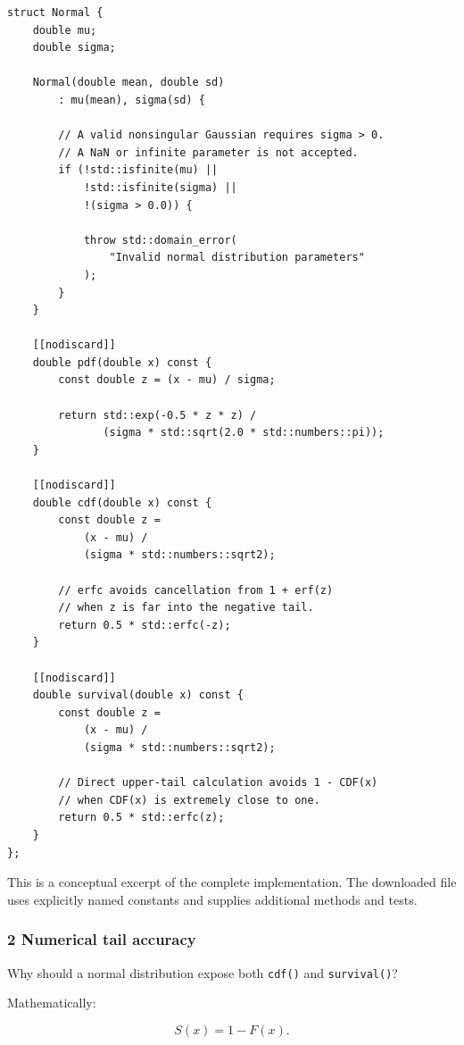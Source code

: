 \begin{verbatim}
struct Normal {
    double mu;
    double sigma;

    Normal(double mean, double sd)
        : mu(mean), sigma(sd) {

        // A valid nonsingular Gaussian requires sigma > 0.
        // A NaN or infinite parameter is not accepted.
        if (!std::isfinite(mu) ||
            !std::isfinite(sigma) ||
            !(sigma > 0.0)) {

            throw std::domain_error(
                "Invalid normal distribution parameters"
            );
        }
    }

    [[nodiscard]]
    double pdf(double x) const {
        const double z = (x - mu) / sigma;

        return std::exp(-0.5 * z * z) /
               (sigma * std::sqrt(2.0 * std::numbers::pi));
    }

    [[nodiscard]]
    double cdf(double x) const {
        const double z =
            (x - mu) /
            (sigma * std::numbers::sqrt2);

        // erfc avoids cancellation from 1 + erf(z)
        // when z is far into the negative tail.
        return 0.5 * std::erfc(-z);
    }

    [[nodiscard]]
    double survival(double x) const {
        const double z =
            (x - mu) /
            (sigma * std::numbers::sqrt2);

        // Direct upper-tail calculation avoids 1 - CDF(x)
        // when CDF(x) is extremely close to one.
        return 0.5 * std::erfc(z);
    }
};
\end{verbatim}

This is a conceptual excerpt of the complete implementation. The downloaded file uses explicitly named constants and supplies additional methods and tests.

\subsubsection{2 Numerical tail accuracy}\label{02-foundations-ii-ch031-numerical-tail-accuracy}

\hypertarget{02-foundations-ii-ch031-numerical-tail-accuracy}{}

Why should a normal distribution expose both \texttt{cdf()} and \texttt{survival()}?

Mathematically:

\[
 S(x)=1-F(x).
\]

